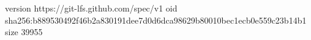 version https://git-lfs.github.com/spec/v1
oid sha256:b889530492f46b2a830191dee7d0d6dca98629b80010bec1ecb0e559c23b14b1
size 39955
